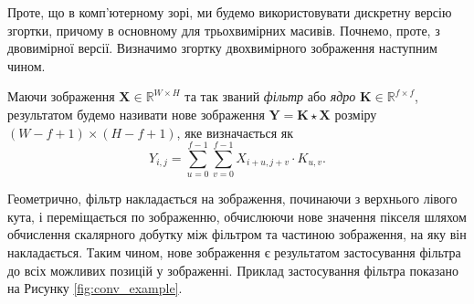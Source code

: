 Проте, що в комп'ютерному зорі, ми будемо використовувати дискретну версію
згортки, причому в основному для трьохвимірних масивів. Почнемо, проте, з 
двовимірної версії. Визначимо згортку двохвимірного зображення наступним чином.
\begin{definition}
    Маючи зображення $\boldsymbol{X} \in \mathbb{R}^{W \times H}$ та так званий
    \textit{фільтр} або \textit{ядро} $\boldsymbol{K} \in \mathbb{R}^{f \times
    f}$, результатом будемо називати нове зображення
    $\boldsymbol{Y}=\boldsymbol{K} \star \boldsymbol{X}$ розміру $(W-f+1) \times
    (H-f+1)$, яке визначається як
    \begin{equation}
        Y_{i,j} = \sum_{u=0}^{f-1} \sum_{v=0}^{f-1} X_{i+u,j+v} \cdot K_{u,v}.
    \end{equation}
\end{definition}

Геометрично, фільтр накладається на зображення, починаючи з верхнього лівого
кута, і переміщається по зображенню, обчислюючи нове значення пікселя шляхом
обчислення скалярного добутку між фільтром та частиною зображення, на яку
він накладається. Таким чином, нове зображення є результатом застосування
фільтра до всіх можливих позицій у зображенні. Приклад застосування фільтра показано 
на Рисунку \ref{fig:conv_example}.

